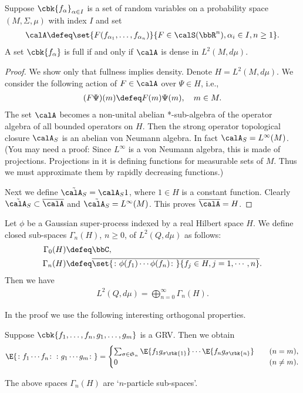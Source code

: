 \documentclass[openany, a4paper, oneside]{jsbook}
\begin{document}
\begin{lem}
 Suppose $\cbk{f_{\alpha}}_{\alpha \in I}$ is a set of random variables on a probability space $(M, \Sigma, \mu)$ with index $I$ and set
 \begin{align}
  \calA
  \defeq
  \set{F (f_{\alpha_1}, \dots, f_{\alpha_n})}{F \in \calS (\bbR^n), \alpha_i \in I, n \geq 1}.
 \end{align}
 A set $\cbk{f_{\alpha}}$ is full if and only if $\calA$ is dense in $L^2 (M, d \mu)$.
\end{lem}
\begin{proof}
 We show only that fullness implies density.
 Denote $H = L^2 (M, d \mu)$.
 We consider the following action of $F \in \calA$ over $\Psi \in H$, i.e.,
 \begin{align}
  (F \Psi) (m) \defeq F (m) \Psi (m), \quad m \in M.
 \end{align}
 The set $\calA$ becomes a non-unital abelian *-sub-algebra of the operator algebra of all bounded operators on $H$.
 Then the strong operator topological closure $\calA_S$ is an abelian von Neumann algebra.
 In fact $\calA_S = L^{\infty} (M)$.
 (You may need a proof:
 Since $L^{\infty}$ is a von Neumann algebra, this is made of projections.
 Projections in it is defining functions for measurable sets of $M$.
 Thus we must approximate them by rapidly decreasing functions.)

 Next we define $\tilde{\calA_S} = \calA_S 1$, where $1 \in H$ is a constant function.
 Clearly $\tilde{\calA_S} \subset \overline{\calA}$ and $\tilde{\calA_S} = L^{\infty}(M)$.
 This proves $\overline{\calA} = H$.
\end{proof}

\begin{thm}
 Let $\phi$ be a Gaussian super-process indexed by a real Hilbert space $H$.
 We define closed sub-spaces $\Gamma_n (H)$, $n \geq 0$, of $L^2 (Q, d \mu)$ as follows:
 \begin{align}
  \Gamma_0 (H)
  &\defeq \bbC, \\
  \Gamma_n (H)
  &\defeq
  \overline{\set{\colon \phi (f_1) \cdots \phi (f_n) \colon}{f_j \in H, j = 1, \cdots, n}}.
 \end{align}
 Then we have
 \begin{align}
  L^2 (Q, d \mu)
  =
  \bigoplus_{n=0}^{\infty} \Gamma_n (H).
 \end{align}
\end{thm}
In the proof we use the following interesting orthogonal properties.
\begin{lem}
 Suppose $\cbk{f_1, \dots, f_n, g_1, \dots, g_m}$ is a GRV.
 Then we obtain
 \begin{align}
  \E{\colon f_1 \cdots f_n \colon \, \colon g_1 \cdots g_m \colon}
  =
  \begin{cases}
   \sum_{\sigma \in \mathfrak{S}_n} \E{f_1 g_{\sigma \rbk{1}}} \cdots \E{f_n g_{\sigma \rbk{n}}} &\quad (n=m), \\
   0 &\quad (n \neq m).
  \end{cases}
 \end{align}
\end{lem}
\begin{rem}
 The above spaces $\Gamma_n (H)$ are `$n$-particle sub-spaces'.
\end{rem}
\end{document}
